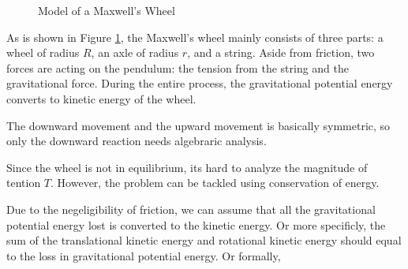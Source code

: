 \documentclass[a4paper]{article}
\begin{document}
\begin{figure}[ht]
    \centering
    \caption{Model of a Maxwell's Wheel}
    \label{fig.maxwellwheel}
\end{figure}

As is shown in Figure \ref{fig.maxwellwheel}, the Maxwell's wheel mainly consists of three parts: a wheel of radius $R$, an axle of radius $r$, and a string. Aside from friction, two forces are acting on the pendulum: the tension from the string and the gravitational force. During the entire process, the gravitational potential energy converts to kinetic energy of the wheel. 

The downward movement and the upward movement is basically symmetric, so only the downward reaction needs algebraric analysis.

Since the wheel is not in equilibrium, its hard to analyze the magnitude of tention $T$. However, the problem can be tackled using conservation of energy.

Due to the negeligibility of friction, we can assume that all the gravitational potential energy lost is converted to the kinetic energy. Or more specificly, the sum of the translational kinetic energy and rotational kinetic energy should equal to the loss in gravitational potential energy. Or formally,
\end{document}
